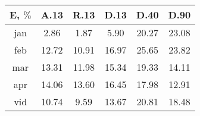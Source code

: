 \begin{tabular}{ | c | c c c c c | } \hline
E, $\%$	&A.13	&R.13	&D.13	&D.40	&D.90\\ \hline
jan	&2.86	&1.87		&5.90	&20.27	&23.08\\
feb	&12.72	&10.91		&16.97	&25.65	&23.82\\
mar	&13.31	&11.98		&15.34	&19.33	&14.11\\
apr	&14.06	&13.60		&16.45	&17.98	&12.91\\ \hline
vid	&10.74	&9.59		&13.67	&20.81	&18.48\\ \hline
\end{tabular}